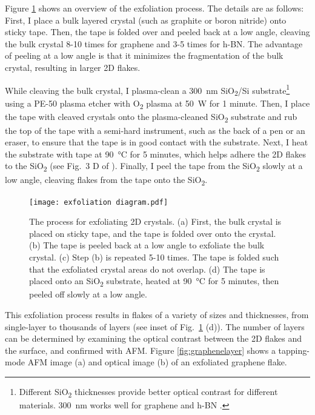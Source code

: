 \documentclass[double,12pt,1in,seploa]{beavtex}
\begin{document}
Figure \ref{exfoliation diagram} shows an overview of the exfoliation process. The details are as follows: First, I place a bulk layered crystal (such as graphite or boron nitride) onto sticky tape. Then, the tape is folded over and peeled back at a low angle, cleaving the bulk crystal 8-10 times for graphene and 3-5 times for h-BN. The advantage of peeling at a low angle is that it minimizes the fragmentation of the bulk crystal, resulting in larger 2D flakes.

While cleaving the bulk crystal, I plasma-clean a \SI{300}{\nano\meter} SiO\textsubscript{2}/Si substrate\footnote{Different SiO\textsubscript{2} thicknesses provide better optical contrast for different materials. \SI{300}{\nano\meter} works well for graphene and h-BN \cite{bing_optical_2018}.} using a PE-50 plasma etcher with O\textsubscript{2} plasma at \SI{50}{\watt} for 1 minute. Then, I place the tape with cleaved crystals onto the plasma-cleaned SiO\textsubscript{2} substrate and rub the top of the tape with a semi-hard instrument, such as the back of a pen or an eraser, to ensure that the tape is in good contact with the substrate. Next, I heat the substrate with tape at \SI{90}{\celsius} for 5 minutes, which helps adhere the 2D flakes to the SiO\textsubscript{2} (see Fig.\ 3 D of \cite{islam_exfoliation_2022}). Finally, I peel the tape from the SiO\textsubscript{2} slowly at a low angle, cleaving flakes from the tape onto the SiO\textsubscript{2}. 


\begin{figure}
    \texttt{[image: exfoliation diagram.pdf]}
    \caption{The process for exfoliating 2D crystals. (a) First, the bulk crystal is placed on sticky tape, and the tape is folded over onto the crystal. (b) The tape is peeled back at a low angle to exfoliate the bulk crystal. (c) Step (b) is repeated 5-10 times. The tape is folded such that the exfoliated crystal areas do not overlap. (d) The tape is placed onto an SiO\textsubscript{2} substrate, heated at \SI{90}{\celsius} for 5 minutes, then peeled off slowly at a low angle.}
    \label{exfoliation diagram}
\end{figure}
This exfoliation process results in flakes of a variety of sizes and thicknesses, from single-layer to thousands of layers (see inset of Fig.\ \ref{exfoliation diagram} (d)). The number of layers can be determined by examining the optical contrast between the 2D flakes and the surface, and confirmed with AFM. Figure \ref{fig:graphenelayer} shows a tapping-mode AFM image (a) and optical image (b) of an exfoliated graphene flake.
\end{document}
